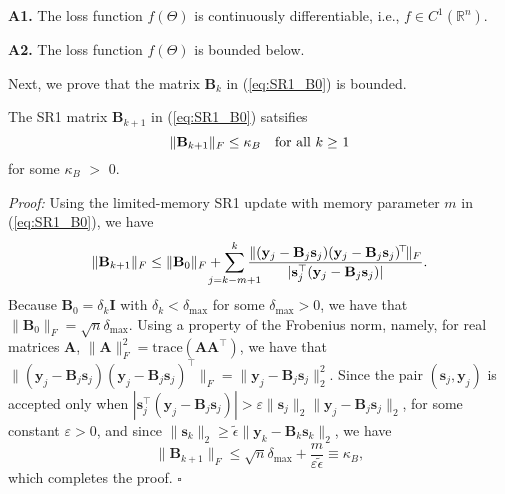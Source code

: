 \medskip

\noindent 
\textbf{A1.} The loss function $f(\Theta)$ is continuously differentiable, i.e., 
$f \in C^1(\mathbb{R}^n)$.

\noindent
\textbf{A2.} The loss function $f(\Theta)$ is bounded below.

\medskip

%

\noindent 
Next, 
we prove that the matrix $\mathbf{B}_k$ in (\ref{eq:SR1_B0}) is bounded.  

\begin{lemma}\label{lemma:1}
The SR1 matrix $\mathbf{B}_{k+1}$  in (\ref{eq:SR1_B0}) satsifies
$$
	\text{$\|\mathbf{B}_{k+1}\|_F  \leq \kappa_B$  \ \ \text{for all $k \geq$ 1}}
$$
for some $\kappa_B$ $>$ 0.
\end{lemma}

\textit{Proof:} 
Using the limited-memory SR1 update with memory parameter $m$ in (\ref{eq:SR1_B0}), we have
$$
	\| \mathbf{B}_{k+1} \|_F \le \| \mathbf{B}_0 \|_F + 
	\hspace{-.4cm}
	\sum_{j = k-m+1}^k 
	\hspace{-.4cm} 
	\frac{\| (\mathbf{y}_j - \mathbf{B}_j\mathbf{s}_j) (\mathbf{y}_j - \mathbf{B}_j\mathbf{s}_j)^{\! \top} \! \|_F}
	{| \mathbf{s}_j^{\top} ( \mathbf{y}_j - \mathbf{B}_j\mathbf{s}_j) |}.
$$
Because $\mathbf{B}_0 = \delta_k \mathbf{I}$ with $\delta_k < \delta_{\max}$ for some $\delta_{\max} > 0$,
we have that $\| \mathbf{B}_0 \|_F = \sqrt{n} \delta_{\max}$.  
Using a property of the Frobenius norm,
namely, for real matrices $\mathbf{A}$, $\| \mathbf{A} \|_F^2 = \text{trace}(\mathbf{AA}^{\top})$, we have that
$\| (\mathbf{y}_j - \mathbf{B}_j\mathbf{s}_j) (\mathbf{y}_j - \mathbf{B}_j\mathbf{s}_j)^{\top} \|_F 
= \| \mathbf{y}_j - \mathbf{B}_j\mathbf{s}_j \|_2^2$.
Since the pair $(\mathbf{s}_j, \mathbf{y}_j)$ is accepted only when $|\mathbf{s}_j^{\top}(\mathbf{y}_j - \mathbf{B}_j\mathbf{s}_j)| > \varepsilon \| \mathbf{s}_j \|_2 \| \mathbf{y}_j - \mathbf{B}_j \mathbf{s}_j \|_2$, for some constant $\varepsilon > 0$, and since $\| \mathbf{s}_k \|_2 \ge \tilde{\epsilon} \| \mathbf{y}_k - \mathbf{B}_k \mathbf{s}_k\|_2$, we have
$$
	\| \mathbf{B}_{k+1} \|_F \le \sqrt{n} \delta_{\max} + \frac{m}{\varepsilon \tilde{\epsilon}} \equiv \kappa_B,
$$
which completes the proof.
$\square$

